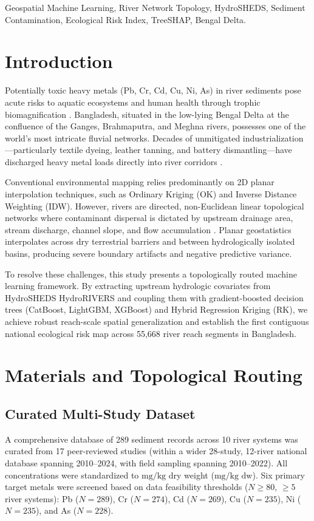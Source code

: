\documentclass[conference]{IEEEtran}
\begin{document}
\begin{IEEEkeywords}
Geospatial Machine Learning, River Network Topology, HydroSHEDS, Sediment Contamination, Ecological Risk Index, TreeSHAP, Bengal Delta.
\end{IEEEkeywords}

\section{Introduction}
Potentially toxic heavy metals (Pb, Cr, Cd, Cu, Ni, As) in river sediments pose acute risks to aquatic ecosystems and human health through trophic biomagnification \cite{Tessier1979,Hakanson1980}. Bangladesh, situated in the low-lying Bengal Delta at the confluence of the Ganges, Brahmaputra, and Meghna rivers, possesses one of the world's most intricate fluvial networks. Decades of unmitigated industrialization---particularly textile dyeing, leather tanning, and battery dismantling---have discharged heavy metal loads directly into river corridors \cite{Ahmad2010,Islam2018,Ali2021}.

Conventional environmental mapping relies predominantly on 2D planar interpolation techniques, such as Ordinary Kriging (OK) and Inverse Distance Weighting (IDW). However, rivers are directed, non-Euclidean linear topological networks where contaminant dispersal is dictated by upstream drainage area, stream discharge, channel slope, and flow accumulation \cite{Lehner2013}. Planar geostatistics interpolates across dry terrestrial barriers and between hydrologically isolated basins, producing severe boundary artifacts and negative predictive variance.

To resolve these challenges, this study presents a topologically routed machine learning framework. By extracting upstream hydrologic covariates from HydroSHEDS HydroRIVERS and coupling them with gradient-boosted decision trees (CatBoost, LightGBM, XGBoost) and Hybrid Regression Kriging (RK), we achieve robust reach-scale spatial generalization and establish the first contiguous national ecological risk map across 55,668 river reach segments in Bangladesh.

\section{Materials and Topological Routing}

\subsection{Curated Multi-Study Dataset}
A comprehensive database of 289 sediment records across 10 river systems was curated from 17 peer-reviewed studies (within a wider 28-study, 12-river national database spanning 2010--2024, with field sampling spanning 2010--2022). All concentrations were standardized to $\text{mg/kg}$ dry weight ($\text{mg/kg dw}$). Six primary target metals were screened based on data feasibility thresholds ($N \ge 80$, $\ge 5$ river systems): Pb ($N=289$), Cr ($N=274$), Cd ($N=269$), Cu ($N=235$), Ni ($N=235$), and As ($N=228$).
\end{document}
